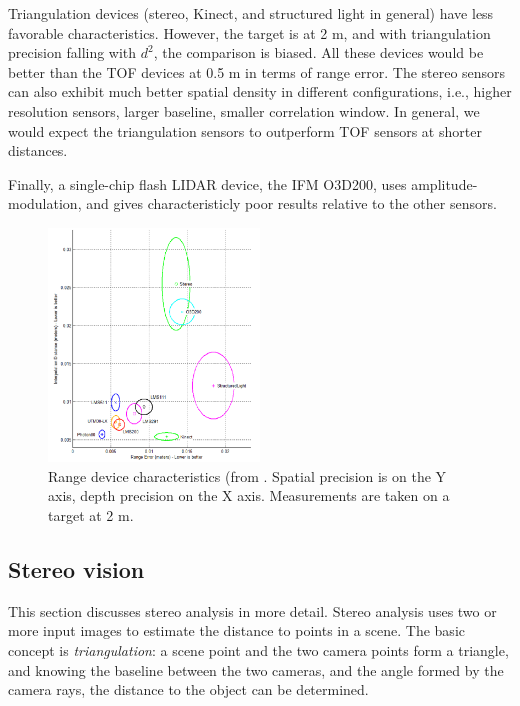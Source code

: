 \documentclass[twocolumn,oneside]{book}
\begin{document}
Triangulation devices (stereo, Kinect, and structured light in
general) have less favorable characteristics.  However, the
target is at 2 m, and with triangulation precision falling with $d^2$,
the comparison is  biased.  All these devices would be better than the
TOF devices at 0.5 m in terms of range error.  The stereo sensors can
also exhibit much better spatial density in different configurations,
i.e., higher resolution sensors, larger baseline, smaller correlation
window.  In general, we would expect the triangulation sensors to
outperform TOF sensors at shorter distances.

Finally, a single-chip flash LIDAR device, the IFM O3D200, uses
amplitude-modulation, and gives characteristicly poor results relative
to the other sensors.

\begin{figure}
    \includegraphics[width=0.5\textwidth]{BOOKFIGS/range-summary}
\caption{Range device characteristics (from \cite{wongIROSXXX}.
  Spatial precision is on the Y axis, depth precision on the X
  axis.  Measurements are taken on a target at 2
  m. \label{fig31.range-summary}}  
\end{figure}



\subsection{Stereo vision}

This section discusses stereo analysis in more detail.  Stereo
analysis uses two or more input images to estimate the distance to
points in a scene.  The basic concept is {\em triangulation}: a scene
point and the two camera points form a triangle, and knowing the
baseline between the two cameras, and the angle formed by the camera
rays, the distance to the object can be determined.
\end{document}

